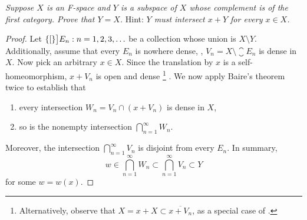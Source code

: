 % 
%
\textit{Suppose $X$ is an F-space and $Y$ is a subspace of $X$ whose complement is of the first category. Prove that $Y=X$. }%
Hint: \textit{$Y$ must intersect $x+Y$ for every $x\in X$. }%
%
\begin{proof}%
Let $\{[\}\big]{E_n: n=1, 2, 3, \dots}$ be a collection whose union is $X\setminus Y$. Additionally, assume that every $E_n$ is nowhere %
dense, \ie,  $V_n = X \setminus \closure{E_n}$ is dense in $X$. Now pick an arbitrary $x \in X$. Since the translation by $x$ %
is a self-homeomorphism, $x + V_n$ is open and dense%
%
  \footnote{Alternatively, observe that $X = x + X \subset \overline{x + V_n}$, as a special case of .}%
%
. %
%
We now apply Baire's theorem twice to establish that %
%
\begin{enumerate}[item-label=(\alph{enumi})]
  \item every intersection $W_n = V_n \cap \left(x+V_n\right)$ is dense in $X$,
  \item so is the nonempty intersection $\bigcap_{n=1}^\infty W_n$. 
\end{enumerate}
%
Moreover, the intersection $\bigcap_{n=1}^\infty V_n$ is disjoint from every $E_n$. In summary, %
%
\begin{equation}\label{2_15_1}
  w \in \bigcap_{n=1}^\infty W_n \subset \bigcap_{n=1}^\infty V_n \subset Y 
\end{equation} 
%
for some $w = w(x)$. %

\end{proof}
